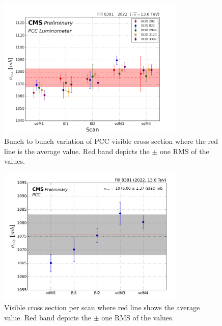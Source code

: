 
\begin{figure}[!htp]
\centering
\includegraphics[width=0.8\textwidth]{ashish_thesis/2022_sigma_vis_btob_variation.png}
\caption[$\sigma_{vis}$ bunch variation]{%
  Bunch to bunch variation of PCC visible cross section where the red line is the average value. Red band depicts the $\pm$ one RMS of the values.
}
\label{fig:period_bound_99}
\end{figure}

\begin{figure}[!htp]
\centering
\includegraphics[width=0.8\textwidth]{ashish_thesis/2022_PCC_sigmavis_per_scan_new.png}
\caption[2022 PCC visible cross section]{%
  Visible cross section per scan where red line shows the average value. Red band depicts the $\pm$ one RMS of the values.
}
\label{fig:period_bound_105}
\end{figure}

